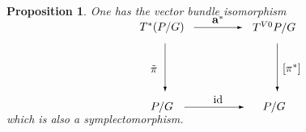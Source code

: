 \documentclass[10pt,a4paper]{amsart}
\DeclareMathOperator{\anch}{\mathbf{a}}
\newcommand{\id}{\text{\upshape id}}
\numberwithin{equation}{section}
\newtheorem{Proposition}[Theorem]{Proposition}
 { \theoremstyle{definition}
\newtheorem{Definition}[Theorem]{Definition}
\newtheorem{Example}[Theorem]{Example}
\newtheorem{Remark}[Theorem]{Remark} }
\begin{document}
 \begin{Proposition}\label{thmquo}
One has the vector bundle isomorphism
\begin{gather*} \unitlength=5mm\begin{picture}(11,4.6)(-1.5,0)
 \put(1,4.5){\makebox(0,0){$T^*(P/G)$}}
 \put(8,4.5){\makebox(0,0){$T^{V0}P/G$}}
 \put(1,-0.5){\makebox(0,0){$P/G$}}
 \put(8,-0.5){\makebox(0,0){$P/G$}}
 \put(1.2,3.5){\vector(0,-1){3}}
 \put(8.2,3.5){\vector(0,-1){3}}
 \put(3,4.5){\vector(1,0){3}}
 \put(2.4,-0.5){\vector(1,0){3.7}}
 \put(0.1,1.9){\makebox(0,0){$ \ $}}
 \put(0.5,1.9){\makebox(0,0){$ \tilde\pi $}}
 \put(9.1,1.9){\makebox(0,0){$[\pi^{*}]$}}
 \put(6.8,1.9){\makebox(0,0){$\ $}}
 \put(4.5,5.0){\makebox(0,0){$\anch^* $}}
 \put(4.5,0){\makebox(0,0){$ \id $}}
 \end{picture}\end{gather*}
 which is also a symplectomorphism.
 \end{Proposition}
\end{document}
